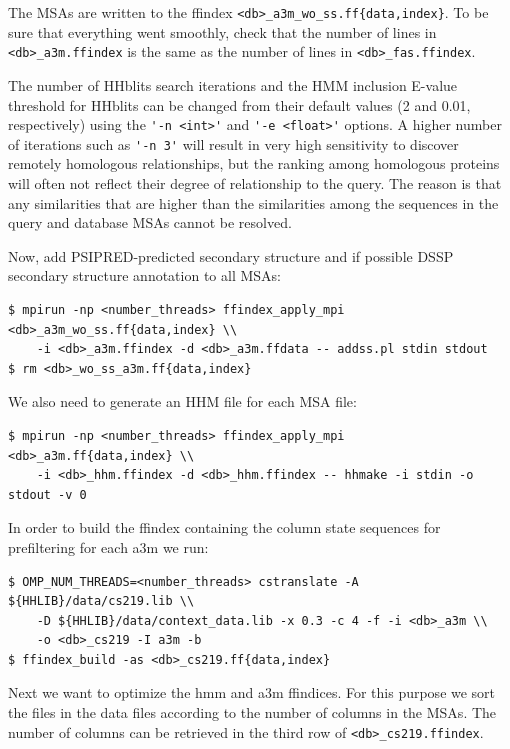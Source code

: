 \documentclass[11pt,a4paper]{article}
\begin{document}
The MSAs are written to the ffindex \verb`<db>_a3m_wo_ss.ff{data,index}`. To be sure that everything went smoothly, check that the number of lines in \verb`<db>_a3m.ffindex` is the same as the number of lines in \verb`<db>_fas.ffindex`. 

The number of HHblits search iterations and the HMM inclusion E-value threshold for HHblits can be changed from their default values (2 and 0.01, respectively) using the \verb`'-n <int>'` and \verb`'-e <float>'` options. A higher number of iterations such as  \verb`'-n 3'` will result in very high sensitivity to discover remotely homologous relationships, but the ranking among homologous proteins will often not reflect their degree of relationship to the query. The reason is that any similarities that are higher than the similarities among the sequences in the query and database MSAs cannot be resolved. 

Now, add PSIPRED-predicted secondary structure and if possible DSSP secondary structure annotation to all MSAs:
\begin{verbatim}
$ mpirun -np <number_threads> ffindex_apply_mpi <db>_a3m_wo_ss.ff{data,index} \\
    -i <db>_a3m.ffindex -d <db>_a3m.ffdata -- addss.pl stdin stdout 
$ rm <db>_wo_ss_a3m.ff{data,index}
\end{verbatim}

We also need to generate an HHM file for each MSA file:

\begin{verbatim}
$ mpirun -np <number_threads> ffindex_apply_mpi <db>_a3m.ff{data,index} \\
    -i <db>_hhm.ffindex -d <db>_hhm.ffindex -- hhmake -i stdin -o stdout -v 0
\end{verbatim}

In order to build the ffindex containing the column state sequences for prefiltering for each a3m we run:

\begin{verbatim}
$ OMP_NUM_THREADS=<number_threads> cstranslate -A ${HHLIB}/data/cs219.lib \\
    -D ${HHLIB}/data/context_data.lib -x 0.3 -c 4 -f -i <db>_a3m \\
    -o <db>_cs219 -I a3m -b
$ ffindex_build -as <db>_cs219.ff{data,index}
\end{verbatim}

Next we want to optimize the hmm and a3m ffindices. For this purpose we sort the files in the
data files according to the number of columns in the MSAs. The number of columns can be retrieved
in the third row of \verb`<db>_cs219.ffindex`.
\end{document}
